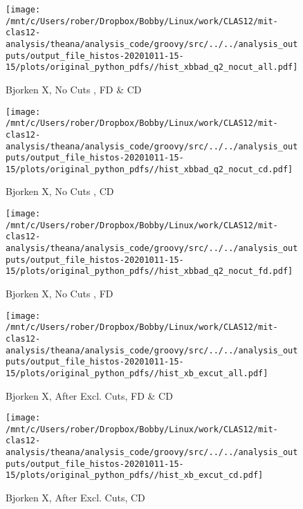 \documentclass{article}
\begin{document}
\begin{landscape}
    \begin{figure}[h]
        \centering

        \texttt{[image: /mnt/c/Users/rober/Dropbox/Bobby/Linux/work/CLAS12/mit-clas12-analysis/theana/analysis\_code/groovy/src/../../analysis\_outputs/output\_file\_histos-20201011-15-15/plots/original\_python\_pdfs//hist\_xbbad\_q2\_nocut\_all.pdf]}
        \captionsetup{textformat=empty,labelformat=blank}
        \caption{Bjorken X, No Cuts , FD \& CD}
    \end{figure}
    \clearpage
    
    \begin{figure}[h]
        \centering

        \texttt{[image: /mnt/c/Users/rober/Dropbox/Bobby/Linux/work/CLAS12/mit-clas12-analysis/theana/analysis\_code/groovy/src/../../analysis\_outputs/output\_file\_histos-20201011-15-15/plots/original\_python\_pdfs//hist\_xbbad\_q2\_nocut\_cd.pdf]}
        \captionsetup{textformat=empty,labelformat=blank}
        \caption{Bjorken X, No Cuts , CD}
    \end{figure}
    \clearpage
    
    \begin{figure}[h]
        \centering

        \texttt{[image: /mnt/c/Users/rober/Dropbox/Bobby/Linux/work/CLAS12/mit-clas12-analysis/theana/analysis\_code/groovy/src/../../analysis\_outputs/output\_file\_histos-20201011-15-15/plots/original\_python\_pdfs//hist\_xbbad\_q2\_nocut\_fd.pdf]}
        \captionsetup{textformat=empty,labelformat=blank}
        \caption{Bjorken X, No Cuts , FD}
    \end{figure}
    \clearpage
    
    \begin{figure}[h]
        \centering

        \texttt{[image: /mnt/c/Users/rober/Dropbox/Bobby/Linux/work/CLAS12/mit-clas12-analysis/theana/analysis\_code/groovy/src/../../analysis\_outputs/output\_file\_histos-20201011-15-15/plots/original\_python\_pdfs//hist\_xb\_excut\_all.pdf]}
        \captionsetup{textformat=empty,labelformat=blank}
        \caption{Bjorken X, After Excl. Cuts, FD \& CD}
    \end{figure}
    \clearpage
    
    \begin{figure}[h]
        \centering

        \texttt{[image: /mnt/c/Users/rober/Dropbox/Bobby/Linux/work/CLAS12/mit-clas12-analysis/theana/analysis\_code/groovy/src/../../analysis\_outputs/output\_file\_histos-20201011-15-15/plots/original\_python\_pdfs//hist\_xb\_excut\_cd.pdf]}
        \captionsetup{textformat=empty,labelformat=blank}
        \caption{Bjorken X, After Excl. Cuts, CD}
    \end{figure}
    \clearpage
    

\end{landscape}
\end{document}
